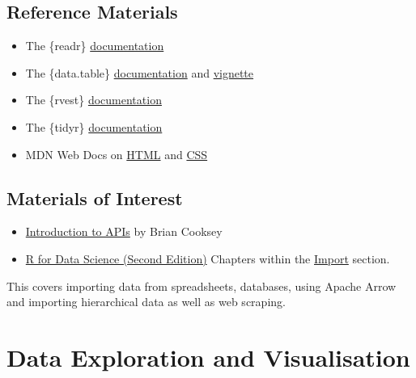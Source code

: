 \documentclass[
  12pt,
]{book}
\providecommand{\tightlist}{%
  \setlength{\itemsep}{0pt}\setlength{\parskip}{0pt}}
\begin{document}
\hypertarget{reference-materials-1}{%
\subsection*{Reference Materials}\label{reference-materials-1}}

\begin{itemize}
\item
  The \{readr\} \href{https://readr.tidyverse.org/}{documentation}
\item
  The \{data.table\} \href{https://cran.r-project.org/web/packages/data.table/data.table.pdf}{documentation} and \href{https://cran.r-project.org/web/packages/data.table/vignettes/datatable-intro.html}{vignette}
\item
  The \{rvest\} \href{https://rvest.tidyverse.org/}{documentation}
\item
  The \{tidyr\} \href{https://tidyr.tidyverse.org/}{documentation}
\item
  MDN Web Docs on \href{https://developer.mozilla.org/en-US/docs/Web/HTML}{HTML} and \href{https://developer.mozilla.org/en-US/docs/Web/CSS}{CSS}
\end{itemize}

\hypertarget{materials-of-interest-1}{%
\subsection*{Materials of Interest}\label{materials-of-interest-1}}

\begin{itemize}
\tightlist
\item
  \href{https://zapier.com/learn/apis/chapter-1-introduction-to-apis/}{Introduction to APIs} by Brian Cooksey
\item
  \href{https://r4ds.hadley.nz/}{R for Data Science (Second Edition)} Chapters within the \href{https://r4ds.hadley.nz/import.html}{Import} section.
\end{itemize}

This covers importing data from spreadsheets, databases, using Apache Arrow and importing hierarchical data as well as web scraping.

\hypertarget{data-exploration-and-visualisation}{%
\section{Data Exploration and Visualisation}\label{data-exploration-and-visualisation}}
\end{document}
